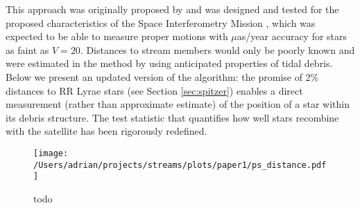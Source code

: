\documentclass[preprint]{aastex}
\begin{document}
This approach was originally proposed by \citep{johnston99a} and was
designed and tested for the proposed characteristics of the Space
Interferometry Mission \citep{unwin08}, which was expected to be able
to measure proper motions with $\mu$as/year accuracy for stars as
faint as $V=20$. Distances to stream members would only be poorly
known and were estimated in the method by using anticipated properties
of tidal debris. Below we present an updated version of the algorithm:
the promise of 2\% distances to RR Lyrae stars (see Section
\ref{sec:spitzer}) enables a direct measurement (rather than
approximate estimate) of the position of a star within its debris
structure. The test statistic that quantifies how well stars recombine
with the satellite has been rigorously redefined.

\begin{figure}[h]
\begin{center}
\texttt{[image: /Users/adrian/projects/streams/plots/paper1/ps\_distance.pdf]}
\caption{ todo }\label{fig:ps_distance}
\end{center}
\end{figure}
\end{document}
